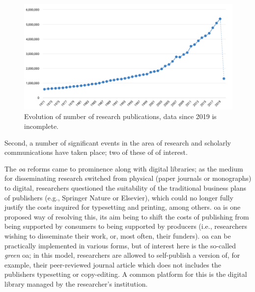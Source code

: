 \begin{figure}[ht!]
\centering
  \includegraphics[width=1\linewidth]{figures/publications.png}  
  \caption{Evolution of number of research publications, data since 2019 is incomplete.}
  \label{fig:nopublications}
\end{figure}

Second, a number of significant events in the area of research and scholarly communications have taken place; two of these of of interest.

The \emph{\gls{oa}} reforms came to prominence along with digital libraries; as the medium for disseminating research switched from physical (paper journals or monographs) to digital, researchers questioned the suitability of the traditional business plans of publishers (e.g., Springer Nature or Elsevier), which could no longer fully justify the costs inquired for typesetting and printing, among others. \gls{oa} is one proposed way of resolving this, its aim being to shift the costs of publishing from being supported by consumers to being supported by producers (i.e., researchers wishing to disseminate their work, or, most often, their funders). \gls{oa} can be practically implemented in various forms, but of interest here is the so-called \emph{green} \gls{oa}; in this model, researchers are allowed to self-publish a version of, for example, their peer-reviewed journal article which does not includes the publishers typesetting or copy-editing. A common platform for this is the digital library managed by the researcher's institution.

